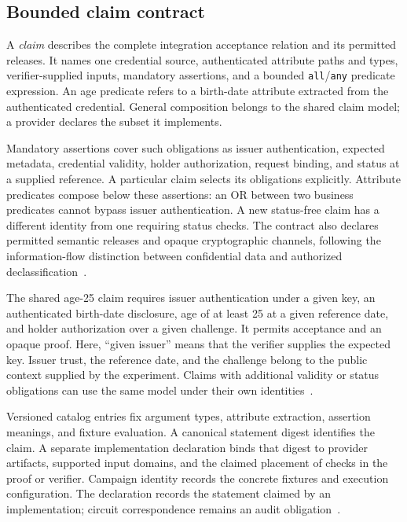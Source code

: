 \documentclass[10pt,twocolumn,letterpaper]{article}
\newcommand{\code}[1]{\texttt{#1}}
\begin{document}
\subsection{Bounded claim contract}
A \emph{claim} describes the complete integration acceptance relation and its permitted releases. It names one credential source, authenticated attribute paths and types, verifier-supplied inputs, mandatory assertions, and a bounded \code{all}/\code{any} predicate expression. An age predicate refers to a birth-date attribute extracted from the authenticated credential. General composition belongs to the shared claim model; a provider declares the subset it implements.

Mandatory assertions cover such obligations as issuer authentication, expected metadata, credential validity, holder authorization, request binding, and status at a supplied reference. A particular claim selects its obligations explicitly. Attribute predicates compose below these assertions: an OR between two business predicates cannot bypass issuer authentication. A new status-free claim has a different identity from one requiring status checks. The contract also declares permitted semantic releases and opaque cryptographic channels, following the information-flow distinction between confidential data and authorized declassification~\cite{declassification}.

The shared age-25 claim requires issuer authentication under a given key, an authenticated birth-date disclosure, age of at least 25 at a given reference date, and holder authorization over a given challenge. It permits acceptance and an opaque proof. Here, ``given issuer'' means that the verifier supplies the expected key. Issuer trust, the reference date, and the challenge belong to the public context supplied by the experiment. Claims with additional validity or status obligations can use the same model under their own identities~\cite{artifact}.

Versioned catalog entries fix argument types, attribute extraction, assertion meanings, and fixture evaluation. A canonical statement digest identifies the claim. A separate implementation declaration binds that digest to provider artifacts, supported input domains, and the claimed placement of checks in the proof or verifier. Campaign identity records the concrete fixtures and execution configuration. The declaration records the statement claimed by an implementation; circuit correspondence remains an audit obligation~\cite{artifact}.
\end{document}
